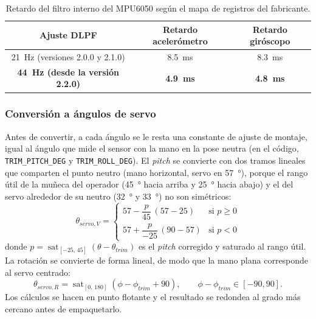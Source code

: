\begin{table}[H]
\centering
\begin{tabular}{c c c}
\toprule
\textbf{Ajuste DLPF} & \textbf{Retardo acelerómetro} & \textbf{Retardo giróscopo} \\
\midrule
\SI{21}{\hertz} (versiones 2.0.0 y 2.1.0) & \SI{8.5}{\milli\second} & \SI{8.3}{\milli\second} \\
\textbf{\SI{44}{\hertz} (desde la versión 2.2.0)} & \textbf{\SI{4.9}{\milli\second}} & \textbf{\SI{4.8}{\milli\second}} \\
\bottomrule
\end{tabular}
\caption{Retardo del filtro interno del MPU6050 según el mapa de registros del fabricante.}
\label{tab:dlpf}
\end{table}

\subsubsection{Conversión a ángulos de servo}
\label{sec:mapeo_munieca}

Antes de convertir, a cada ángulo se le resta una constante de ajuste de montaje, igual al ángulo que mide el sensor con la mano en la pose neutra (en el código, \texttt{TRIM\_PITCH\_DEG} y \texttt{TRIM\_ROLL\_DEG}). El \textit{pitch} se convierte con dos tramos lineales que comparten el punto neutro (mano horizontal, servo en \SI{57}{\degree}), porque el rango útil de la muñeca del operador (\SI{45}{\degree} hacia arriba y \SI{25}{\degree} hacia abajo) y el del servo alrededor de su neutro (\SI{32}{\degree} y \SI{33}{\degree}) no son simétricos:
\begin{equation}
\theta_{servo,V} =
\begin{cases}
57 - \dfrac{p}{45}\,(57 - 25) & \text{si } p \geq 0 \\[2ex]
57 + \dfrac{p}{-25}\,(90 - 57) & \text{si } p < 0
\end{cases}
\end{equation}
donde $p = \operatorname{sat}_{[-25,\,45]}\left(\theta - \theta_{trim}\right)$ es el \textit{pitch} corregido y saturado al rango útil.
La rotación se convierte de forma lineal, de modo que la mano plana corresponde al servo centrado:
\begin{equation}
\theta_{servo,R} = \operatorname{sat}_{[0,\,180]}\left(\phi - \phi_{trim} + 90\right), \qquad \phi - \phi_{trim} \in [-90, 90].
\end{equation}
Los cálculos se hacen en punto flotante y el resultado se redondea al grado más cercano antes de empaquetarlo.

